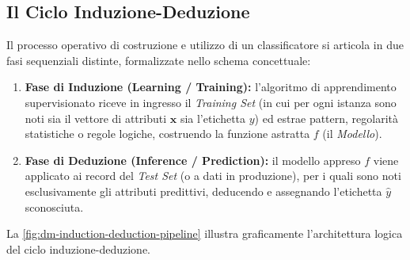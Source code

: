 \FloatBarrier
\subsection{Il Ciclo Induzione-Deduzione}
\label{subsec:dm-classif-induction-deduction}

Il processo operativo di costruzione e utilizzo di un classificatore si articola in due fasi sequenziali distinte, formalizzate nello schema concettuale:
\begin{enumerate}
    \item \textbf{Fase di Induzione (Learning / Training):} l'algoritmo di apprendimento supervisionato riceve in ingresso il \textit{Training Set} (in cui per ogni istanza sono noti sia il vettore di attributi $\mathbf{x}$ sia l'etichetta $y$) ed estrae pattern, regolarità statistiche o regole logiche, costruendo la funzione astratta $f$ (il \textit{Modello}).
    \item \textbf{Fase di Deduzione (Inference / Prediction):} il modello appreso $f$ viene applicato ai record del \textit{Test Set} (o a dati in produzione), per i quali sono noti esclusivamente gli attributi predittivi, deducendo e assegnando l'etichetta $\hat{y}$ sconosciuta.
\end{enumerate}

La \autoref{fig:dm-induction-deduction-pipeline} illustra graficamente l'architettura logica del ciclo induzione-deduzione.

